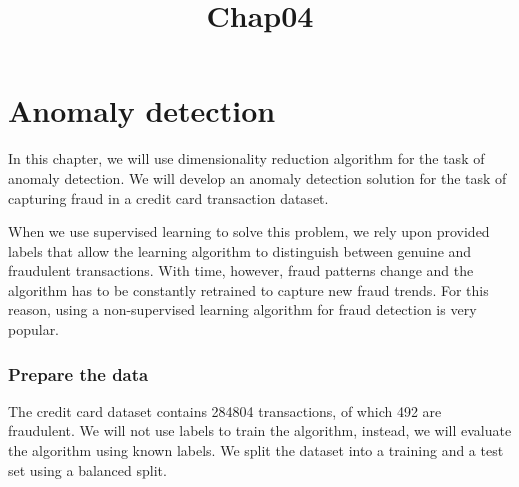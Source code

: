 \documentclass[11pt]{article}
\title{Chap04}
\begin{document}
    
    
    \maketitle
    
    

    
    \section{Anomaly detection}\label{anomaly-detection}

In this chapter, we will use dimensionality reduction algorithm for the
task of anomaly detection. We will develop an anomaly detection solution
for the task of capturing fraud in a credit card transaction dataset.

When we use supervised learning to solve this problem, we rely upon
provided labels that allow the learning algorithm to distinguish between
genuine and fraudulent transactions. With time, however, fraud patterns
change and the algorithm has to be constantly retrained to capture new
fraud trends. For this reason, using a non-supervised learning algorithm
for fraud detection is very popular.

\subsubsection{Prepare the data}\label{prepare-the-data}

The credit card dataset contains 284804 transactions, of which 492 are
fraudulent. We will not use labels to train the algorithm, instead, we
will evaluate the algorithm using known labels. We split the dataset
into a training and a test set using a balanced split.
\end{document}
